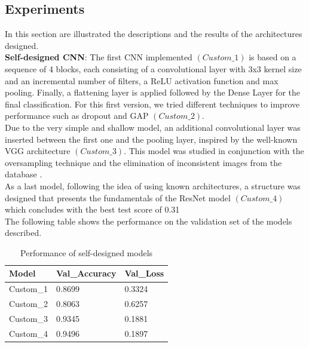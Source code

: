 \documentclass[11pt]{article}
\begin{document}
\begin{multicols}{2}
        \section{Experiments}
         In this section are illustrated the descriptions and the results of the architectures designed.\\
        \textbf{Self-designed CNN}: The first CNN implemented \( (Custom\_1) \)  is based on a sequence of 4 blocks, each consisting of a convolutional layer with 3x3 kernel size and an incremental number of filters, a ReLU activation function and max pooling. Finally, a flattening layer is applied followed by the Dense Layer for the final classification. For this first version, we tried different techniques to improve performance such as dropout and GAP \( (Custom\_2) \).\\ Due to the very simple and shallow model, an additional convolutional layer was inserted between the first one and the pooling layer, inspired by the well-known VGG architecture \( (Custom\_3) \). This model was studied in conjunction with the oversampling technique and the elimination of inconsistent images from the database . 
        \\As a last model, following the idea of using known architectures, a structure was designed that presents the fundamentals of the ResNet model \( (Custom\_4) \) which concludes with the best test score of 0.31 \\
        The following table shows the performance on the validation set of the models described.
        \begin{table}[H]
            \centering
            \setlength{\tabcolsep}{3pt}
            \caption{Performance of self-designed models}
            \begin{tabularx}{\linewidth}{p{3.0cm} p{3.0cm} p{3.0cm}}
                \toprule
                Model & Val\_Accuracy & Val\_Loss\\
                \midrule
                Custom\_1 & 0.8699 & 0.3324\\
                Custom\_2 & 0.8063 & 0.6257\\
                Custom\_3 & 0.9345 & 0.1881\\
                Custom\_4 & 0.9496 & 0.1897\\
                \bottomrule
            \end{tabularx}
            \label{tb:Measurements}
        \end{table}



\end{multicols}
\end{document}
